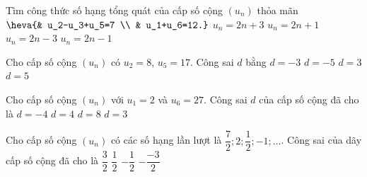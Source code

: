 \begin{ex}%
	Tìm công thức số hạng tổng quát của cấp số cộng $(u_n)$ thỏa  mãn $\heva{& u_2-u_3+u_5=7 \\ & u_1+u_6=12.}$
	 \choice
		{$u_n=2n+3$} 
		{$u_n=2n+1$} 
		{$u_n=2n-3$} 
		 {\True $u_n=2n-1$}
\end{ex}

\begin{ex}%
	Cho cấp số cộng  $(u_n)$ có $u_2=8$, $u_5=17$. Công sai $d$ bằng
	\choice 
		{$d=-3$} 
		{$d=-5$} 
		{\True $d=3$} 
		 {$d=5$}
\end{ex}

\begin{ex}%
	 Cho cấp số cộng $\left(u_n\right)$ với $u_1 = 2$ và $u_6 = 27$. Công sai $d$ của cấp số cộng đã cho là
	\choice 
		{$d  = -4$}
		{\True $d = 4$} 
		{$d  = 8$}
		{$d =  3$}
\end{ex}

\begin{ex}%
	Cho cấp số cộng $(u_{n})$ có các  số hạng lần lượt là $\dfrac{7}{2};2;\dfrac{1}{2};-1;\ldots$. Công sai của dãy cấp số cộng đã cho là
	\choice 
		{$\dfrac{3}{2}$} 
		 {$\dfrac{1}{2}$}
		{$-\dfrac{1}{2}$} 
		{\True $-\dfrac{-3}{2}$} 
\end{ex}

